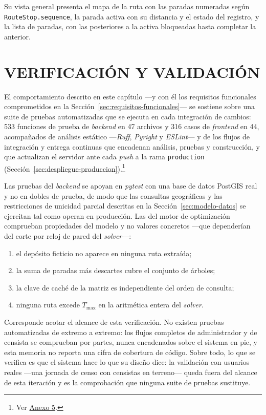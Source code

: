 Su vista general presenta el mapa de la ruta con las paradas numeradas según
\texttt{RouteStop.sequence}, la parada activa con su distancia y el estado del registro, y la lista
de paradas, con las posteriores a la activa bloqueadas hasta completar la anterior.

\section{VERIFICACIÓN Y VALIDACIÓN}
\label{sec:verificacion}

El comportamiento descrito en este capítulo ---y con él los requisitos funcionales comprometidos en
la Sección~\ref{sec:requisitos-funcionales}--- se sostiene sobre una suite de pruebas automatizadas
que se ejecuta en cada integración de cambios: 533 funciones de prueba de \textit{backend} en 47
archivos y 316 casos de \textit{frontend} en 44, acompañados de análisis estático
---\textit{Ruff}, \textit{Pyright} y \textit{ESLint}--- y de los flujos de integración y entrega
continuas que encadenan análisis, pruebas y construcción, y que actualizan el servidor ante cada
\textit{push} a la rama \texttt{production}
(Sección~\ref{sec:despliegue-produccion}).\footnote{Ver \hyperref[anx:trazabilidad]{Anexo 5}.}

Las pruebas del \textit{backend} se apoyan en \textit{pytest} con una base de datos PostGIS real y
no en dobles de prueba, de modo que las consultas geográficas y las restricciones de unicidad
parcial descritas en la Sección~\ref{sec:modelo-datos} se ejercitan tal como operan en producción.
Las del motor de optimización comprueban propiedades del modelo y no valores concretos ---que
dependerían del corte por reloj de pared del \textit{solver}---:

\begin{enumerate}
  \item el depósito ficticio no aparece en ninguna ruta extraída;
  \item la suma de paradas más descartes cubre el conjunto de árboles;
  \item la clave de caché de la matriz es independiente del orden de consulta;
  \item ninguna ruta excede $T_{\max}$ en la aritmética entera del \textit{solver}.
\end{enumerate}

Corresponde acotar el alcance de esta verificación. No existen pruebas automatizadas de extremo a
extremo: los flujos completos de administrador y de censista se comprueban por partes, nunca
encadenados sobre el sistema en pie, y esta memoria no reporta una cifra de cobertura de código.
Sobre todo, lo que se verifica es que el sistema hace lo que su diseño dice: la validación con
usuarios reales ---una jornada de censo con censistas en terreno--- queda fuera del alcance de esta
iteración y es la comprobación que ninguna suite de pruebas sustituye.

